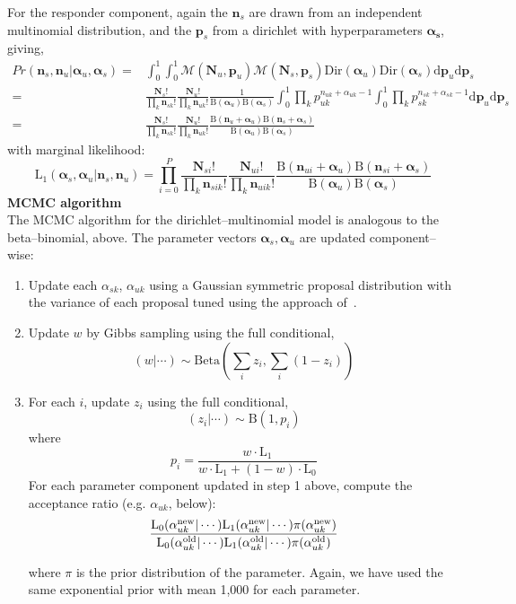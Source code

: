 \documentclass{article}
\begin{document}
For the responder component, again the $\mathbf{n}_s$ are drawn from an independent multinomial distribution, and the $\mathbf{p}_s$ from a dirichlet with hyperparameters $\boldsymbol{\alpha_s}$, giving,
\[
\begin{split}
Pr(\mathbf{n}_s,\mathbf{n}_u|\boldsymbol{\alpha}_u,\boldsymbol{\alpha}_s)=&\int_0^1\int_0^1 \mathcal{M}(\mathbf{N}_u,\mathbf{p}_u)\mathcal{M}(\mathbf{N}_s,\mathbf{p}_s)\mathrm{Dir}(\boldsymbol{\alpha}_u)\mathrm{Dir}(\boldsymbol{\alpha}_s)\mathrm{d}\mathbf{p}_u\mathrm{d}\mathbf{p}_s\\
=&\frac{\mathbf{N}_s!}{\prod_k \mathbf{n}_{sk}!}\frac{\mathbf{N}_u!}{\prod_k \mathbf{n}_{uk}!}\frac{1}{\mathrm{B}(\boldsymbol{\alpha}_u)\mathrm{B}(\boldsymbol{\alpha}_s)}\int_0^1\prod_k p^{n_{uk}+\alpha_{uk}-1}_{uk}\int_0^1 \prod_k p^{n_{sk}+\alpha_{sk}-1}_{sk}\mathrm{d}\mathbf{p}_u\mathrm{d}\mathbf{p}_s\\
=&\frac{\mathbf{N}_s!}{\prod_k \mathbf{n}_{sk}!}\frac{\mathbf{N}_u!}{\prod_k \mathbf{n}_{uk}!}\frac{\mathrm{B}(\mathbf{n}_u+\boldsymbol{\alpha}_u)\mathrm{B}(\mathbf{n}_s+\boldsymbol{\alpha}_s)}{\mathrm{B}(\boldsymbol{\alpha}_u)\mathrm{B}(\boldsymbol{\alpha}_s)}
\end{split}
\]
with marginal likelihood:
\[
\mathrm{L_1}(\boldsymbol{\alpha}_s,\boldsymbol{\alpha}_u|\mathbf{n}_s,\mathbf{n}_u)=\prod_{i=0}^P\frac{\mathbf{N}_{si}!}{\prod_k \mathbf{n}_{sik}!}\frac{\mathbf{N}_{ui}!}{\prod_k \mathbf{n}_{uik}!}\frac{\mathrm{B}(\mathbf{n}_{ui}+\boldsymbol{\alpha}_u)\mathrm{B}(\mathbf{n}_{si}+\boldsymbol{\alpha}_s)}{\mathrm{B}(\boldsymbol{\alpha}_u)\mathrm{B}(\boldsymbol{\alpha}_s)}
\]
\noindent\textbf{MCMC algorithm}\\
The MCMC algorithm for the dirichlet--multinomial model is analogous to the beta--binomial, above. The parameter vectors $\boldsymbol{\alpha}_s,\boldsymbol{\alpha}_u$ are updated component--wise:
\begin{enumerate}
\item  Update each $\alpha_{sk}$, $\alpha_{uk}$ using a Gaussian symmetric proposal distribution with the variance of each proposal tuned using the approach of~\cite{Gelman:2004tc}. 
\item Update $w$ by Gibbs sampling using the full conditional,
\[
(w|\cdots)\sim\mathrm{Beta}(\sum_i z_i,\sum_i(1-z_i))
\]
\item For each $i$, update $z_i$ using the full conditional,
\[
(z_i|\cdots)\sim \mathrm{B}(1,p_i)
\]
where 
\[
p_i = \frac{w\cdot\mathrm{L_1}}{w\cdot\mathrm{L_1}+(1-w)\cdot\mathrm{L_0}}
\]
For each parameter component updated in step 1 above, compute the acceptance ratio (e.g. $\alpha_{uk}$, below):
\[
\frac{\mathrm{L_0}(\alpha^{\text{new}}_{uk}|\cdots)\mathrm{L_1}(\alpha^{\text{new}}_{uk}|\cdots)\pi(\alpha^{\text{new}}_{uk})}{\mathrm{L_0}(\alpha^{\text{old}}_{uk}|\cdots)\mathrm{L_1}(\alpha^{\text{old}}_{uk}|\cdots)\pi(\alpha^{\text{old}}_{uk})}\\
\]

where $\pi$ is the prior distribution of the parameter. Again, we have used the same exponential prior with mean 1,000 for each parameter.
\end{enumerate}
\end{document}
